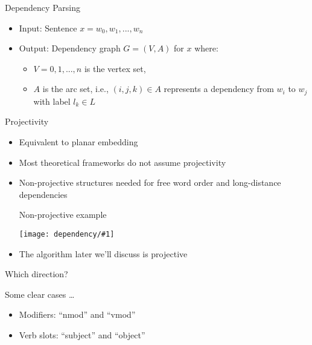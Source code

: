 \documentclass[compress]{beamer}
\newcommand{\gfx}[2]{
\begin{center}
	\texttt{[image: dependency/\#1]}
\end{center}
}
\begin{document}
\begin{frame}{Dependency Parsing}

\begin{itemize}
  \item  Input: Sentence $x = w_0,w_1,...,w_n$
  \item Output: Dependency graph $G = (V , A)$ for $x$ where:
  \begin{itemize}
    \item   $V = {0, 1, . . . , n}$ is the vertex set,
    \item   $A$ is the arc set, i.e., $(i, j, k) \in A$ represents a dependency from $w_i$ to $w_j$ with label $l_k \in L$
  \end{itemize}
\end{itemize}
\end{frame}




\begin{frame}{Projectivity}

  \begin{itemize}
    \item Equivalent to planar embedding
    \item Most theoretical frameworks do not assume projectivity
    \item Non-projective structures needed for free word order and long-distance dependencies
  \begin{block}{Non-projective example}
    \gfx{nonprojective}{.7}
  \end{block}
    \item The algorithm later we'll discuss is projective
  \end{itemize}



\end{frame}

\begin{frame}{Which direction?}

Some clear cases \dots
\begin{itemize}
  \item Modifiers: ``nmod'' and ``vmod''
  \item Verb slots: ``subject'' and ``object''
\end{itemize}
\vspace{2cm}

\footnotesize
\begin{mylinkage}{49}{1} %
\thicklines
{}
\end{mylinkage}

\end{frame}
\end{document}
